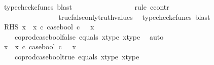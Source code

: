 \begin{isabellebody}
\ {\isacharparenleft}{\kern0pt}typecheck{\isacharunderscore}{\kern0pt}cfuncs{\isacharcomma}{\kern0pt}\ blast{\isacharparenright}{\kern0pt}\isanewline
\ \ \ \ \ \ \isamarkupfalse%
\ {\isachardoublequoteopen}{\isasymomega}{}\ {\isacharequal}{\kern0pt}\ {\isasymf}{\isachardoublequoteclose}\isanewline
\ \ \ \ \ \ \isamarkupfalse%
{\isacharparenleft}{\kern0pt}rule\ ccontr{\isacharparenright}{\kern0pt}\isanewline
\ \ \ \ \ \ \ \ \isamarkupfalse%
\ {\isachardoublequoteopen}{\isasymomega}{}\ {\isasymnoteq}\ {\isasymf}{\isachardoublequoteclose}\isanewline
\ \ \ \ \ \ \ \ \isamarkupfalse%
\ \isamarkupfalse%
\ {\isachardoublequoteopen}{\isasymomega}{}\ {\isacharequal}{\kern0pt}\ {\isasymt}{\isachardoublequoteclose}\isanewline
\ \ \ \ \ \ \ \ \ \ \isamarkupfalse%
\ \ true{\isacharunderscore}{\kern0pt}false{\isacharunderscore}{\kern0pt}only{\isacharunderscore}{\kern0pt}truth{\isacharunderscore}{\kern0pt}values\ \isamarkupfalse%
\ {\isacharparenleft}{\kern0pt}typecheck{\isacharunderscore}{\kern0pt}cfuncs{\isacharcomma}{\kern0pt}\ blast{\isacharparenright}{\kern0pt}\isanewline
\ \ \ \ \ \ \ \ \isamarkupfalse%
\ \isamarkupfalse%
\ RHS{\isacharcolon}{\kern0pt}\ {\isachardoublequoteopen}{\isacharparenleft}{\kern0pt}x{}\ {\isasymamalg}\ x{}\ {\isasymcirc}\isactrlsub c\ case{\isacharunderscore}{\kern0pt}bool{\isacharparenright}{\kern0pt}\ {\isasymcirc}\isactrlsub c\ {\isasymomega}{}\ {\isacharequal}{\kern0pt}\ x{}{\isachardoublequoteclose}\isanewline
\ \ \ \ \ \ \ \ \ \ \isamarkupfalse%
\ {\isacartoucheopen}{\isasymomega}{}\ {\isacharequal}{\kern0pt}\ {\isasymf}{\isacartoucheclose}\ coprod{\isacharunderscore}{\kern0pt}case{\isacharunderscore}{\kern0pt}bool{\isacharunderscore}{\kern0pt}false\ equals\ x{}{\isacharunderscore}{\kern0pt}type\ x{}{\isacharunderscore}{\kern0pt}type\ \isamarkupfalse%
\ auto\isanewline
\ \ \ \ \ \ \ \ \isamarkupfalse%
\ {\isachardoublequoteopen}{\isacharparenleft}{\kern0pt}x{}\ {\isasymamalg}\ x{}\ {\isasymcirc}\isactrlsub c\ case{\isacharunderscore}{\kern0pt}bool{\isacharparenright}{\kern0pt}\ {\isasymcirc}\isactrlsub c\ {\isasymomega}{}\ {\isacharequal}{\kern0pt}\ x{}{\isachardoublequoteclose}\isanewline
\ \ \ \ \ \ \ \ \ \ \isamarkupfalse%
\ {\isacartoucheopen}{\isasymomega}{}\ {\isacharequal}{\kern0pt}\ {\isasymt}{\isacartoucheclose}\ coprod{\isacharunderscore}{\kern0pt}case{\isacharunderscore}{\kern0pt}bool{\isacharunderscore}{\kern0pt}true\ equals\ x{}{\isacharunderscore}{\kern0pt}type\ x{}{\isacharunderscore}{\kern0pt}type\ \isamarkupfalse%

\end{isabellebody}
